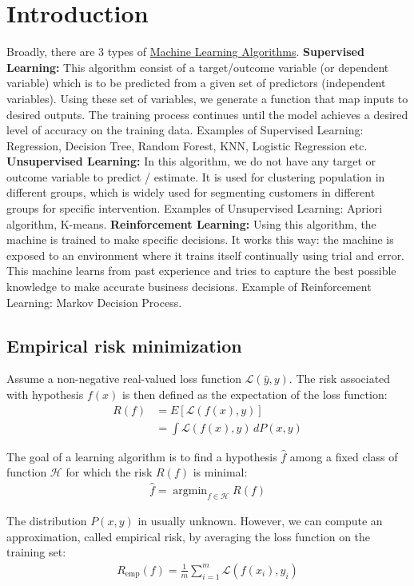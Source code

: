 \documentclass{book}
\DeclareMathOperator*{\argmin}{argmin}
\begin{document}
\chapter{Introduction}
Broadly, there are 3 types of \href{https://www.analyticsvidhya.com/blog/2017/09/common-machine-learning-algorithms/}{Machine Learning Algorithms}.
\textbf{Supervised Learning:} This algorithm consist of a target/outcome variable (or dependent variable) which is to be predicted from a given set of predictors (independent variables). Using these set of variables, we generate a function that map inputs to desired outputs. The training process continues until the model achieves a desired level of accuracy on the training data. Examples of Supervised Learning: Regression, Decision Tree, Random Forest, KNN, Logistic Regression etc.
\textbf{Unsupervised Learning:} In this algorithm, we do not have any target or outcome variable to predict / estimate.  It is used for clustering population in different groups, which is widely used for segmenting customers in different groups for specific intervention. Examples of Unsupervised Learning: Apriori algorithm, K-means.
\textbf{Reinforcement Learning:} Using this algorithm, the machine is trained to make specific decisions. It works this way: the machine is exposed to an environment where it trains itself continually using trial and error. This machine learns from past experience and tries to capture the best possible knowledge to make accurate business decisions. Example of Reinforcement Learning: Markov Decision Process.

\section{Empirical risk minimization}
Assume a non-negative real-valued loss function $\mathcal{L}(\hat{y},y)$.
The risk associated with hypothesis $f(x)$ is then defined as the expectation of the loss function:
\begin{align*}
R(f) &= E[\mathcal{L}(f(x),y)] \\
	    &= \int{\mathcal{L}(f(x),y)}\,dP(x,y)
\end{align*}

The goal of a learning algorithm is to find a hypothesis $\hat{f}$ among a fixed class of function $\mathcal{H}$ for which the risk $R(f)$ is minimal:
\begin{align*}
\hat{f} = \argmin_{f \in \mathcal{H}}{R(f)}
\end{align*}

The distribution $P(x,y)$ in usually unknown. However, we can compute an approximation, called empirical risk, by averaging the loss function on the training set:
\begin{align*}
R_{\mbox{emp}}(f) = \frac{1}{m} \sum_{i=1}^{m} \mathcal{L}(f(x_i),y_i)
\end{align*} 
\end{document}
